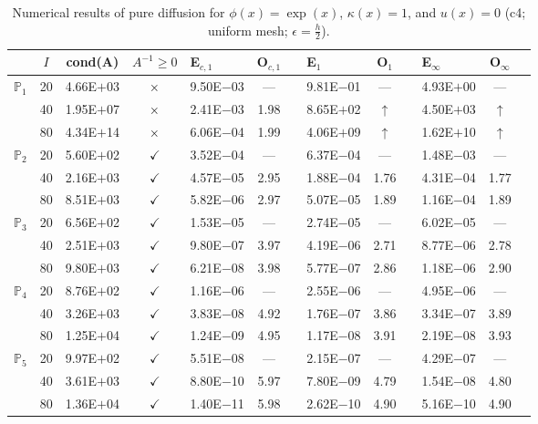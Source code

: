 \begin{table}[H]
\centering
\caption{Numerical results of pure diffusion for $\phi(x)=\exp(x)$, $\kappa(x)=1$, and $u(x)=0$ (c4; uniform mesh; $\epsilon=\frac{h}{2}$).}
\begin{tabular}{@{}l c c c l c c l c c l c c@{}}
\toprule
 & $I$ & cond(A) & $A^{-1}\geq 0$ &  E$_{c,1}$ & O$_{c,1}$ && E$_1$ & O$_1$ && E$_{\infty}$ & O$_{\infty}$\\
\midrule
\multirow{3}{*}{$\mathbb{P}_{1}$}
 & 20 & 4.66E$+$03 & $\times$ & 9.50E$-$03 & --- && 9.81E$-$01 & --- && 4.93E$+$00 & ---\\
 & 40 & 1.95E$+$07 & $\times$ & 2.41E$-$03 & 1.98 && 8.65E$+$02 & $\uparrow$ && 4.50E$+$03 & $\uparrow$\\
 & 80 & 4.34E$+$14 & $\times$ & 6.06E$-$04 & 1.99 && 4.06E$+$09 & $\uparrow$ && 1.62E$+$10 & $\uparrow$\\
\midrule
\multirow{3}{*}{$\mathbb{P}_{2}$}
 & 20 & 5.60E$+$02 & $\checkmark$ & 3.52E$-$04 & --- && 6.37E$-$04 & --- && 1.48E$-$03 & ---\\
 & 40 & 2.16E$+$03 & $\checkmark$ & 4.57E$-$05 & 2.95 && 1.88E$-$04 & 1.76 && 4.31E$-$04 & 1.77\\
 & 80 & 8.51E$+$03 & $\checkmark$ & 5.82E$-$06 & 2.97 && 5.07E$-$05 & 1.89 && 1.16E$-$04 & 1.89\\
\midrule
\multirow{3}{*}{$\mathbb{P}_{3}$}
 & 20 & 6.56E$+$02 & $\checkmark$ & 1.53E$-$05 & --- && 2.74E$-$05 & --- && 6.02E$-$05 & ---\\
 & 40 & 2.51E$+$03 & $\checkmark$ & 9.80E$-$07 & 3.97 && 4.19E$-$06 & 2.71 && 8.77E$-$06 & 2.78\\
 & 80 & 9.80E$+$03 & $\checkmark$ & 6.21E$-$08 & 3.98 && 5.77E$-$07 & 2.86 && 1.18E$-$06 & 2.90\\
\midrule
\multirow{3}{*}{$\mathbb{P}_{4}$}
 & 20 & 8.76E$+$02 & $\checkmark$ & 1.16E$-$06 & --- && 2.55E$-$06 & --- && 4.95E$-$06 & ---\\
 & 40 & 3.26E$+$03 & $\checkmark$ & 3.83E$-$08 & 4.92 && 1.76E$-$07 & 3.86 && 3.34E$-$07 & 3.89\\
 & 80 & 1.25E$+$04 & $\checkmark$ & 1.24E$-$09 & 4.95 && 1.17E$-$08 & 3.91 && 2.19E$-$08 & 3.93\\
\midrule
\multirow{3}{*}{$\mathbb{P}_{5}$}
 & 20 & 9.97E$+$02 & $\checkmark$ & 5.51E$-$08 & --- && 2.15E$-$07 & --- && 4.29E$-$07 & ---\\
 & 40 & 3.61E$+$03 & $\checkmark$ & 8.80E$-$10 & 5.97 && 7.80E$-$09 & 4.79 && 1.54E$-$08 & 4.80\\
 & 80 & 1.36E$+$04 & $\checkmark$ & 1.40E$-$11 & 5.98 && 2.62E$-$10 & 4.90 && 5.16E$-$10 & 4.90\\
\bottomrule
\end{tabular}
\end{table}